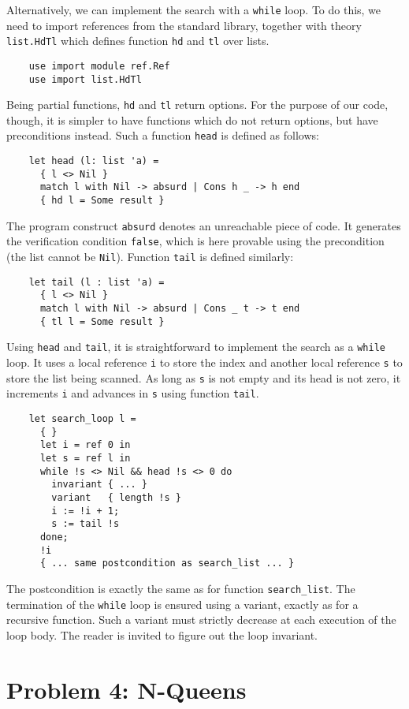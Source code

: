 Alternatively, we can implement the search with a \texttt{while} loop.
To do this, we need to import references from the standard library,
together with theory \texttt{list.HdTl} which defines function
\texttt{hd} and \texttt{tl} over lists.
\begin{verbatim}
    use import module ref.Ref
    use import list.HdTl
\end{verbatim}
Being partial functions, \texttt{hd} and \texttt{tl} return options.
For the purpose of our code, though, it is simpler to have functions
which do not return options, but have preconditions instead. Such a
function \texttt{head} is defined as follows:
\begin{verbatim}
    let head (l: list 'a) =
      { l <> Nil }
      match l with Nil -> absurd | Cons h _ -> h end
      { hd l = Some result }
\end{verbatim}
The program construct \texttt{absurd} denotes an unreachable piece of
code. It generates the verification condition \texttt{false}, which is
here provable using the precondition (the list cannot be \texttt{Nil}).
Function \texttt{tail} is defined similarly:
\begin{verbatim}
    let tail (l : list 'a) =
      { l <> Nil }
      match l with Nil -> absurd | Cons _ t -> t end
      { tl l = Some result }
\end{verbatim}
Using \texttt{head} and \texttt{tail}, it is straightforward to
implement the search as a \texttt{while} loop.
It uses a local reference \texttt{i} to store the index and another
local reference \texttt{s} to store the list being scanned.
As long as \texttt{s} is not empty and its head is not zero, it
increments \texttt{i} and advances in \texttt{s} using function \texttt{tail}.
\begin{verbatim}
    let search_loop l =
      { }
      let i = ref 0 in
      let s = ref l in
      while !s <> Nil && head !s <> 0 do
        invariant { ... }
        variant   { length !s }
        i := !i + 1;
        s := tail !s
      done;
      !i
      { ... same postcondition as search_list ... }
\end{verbatim}
The postcondition is exactly the same as for function \verb|search_list|.
The termination of the \texttt{while} loop is ensured using a variant,
exactly as for a recursive function. Such a variant must strictly decrease at
each execution of the loop body. The reader is invited to figure out
the loop invariant.

\section{Problem 4: N-Queens}

